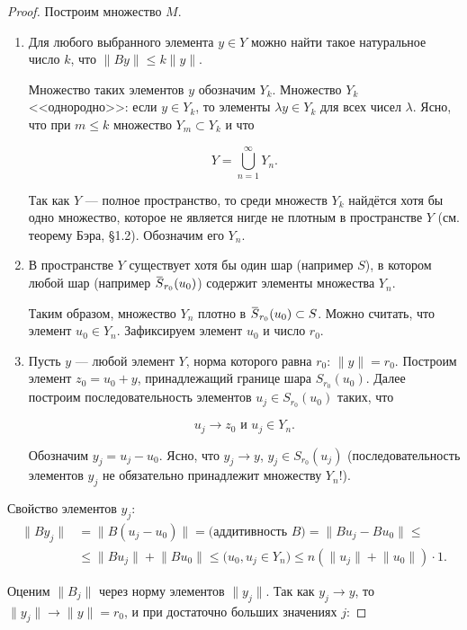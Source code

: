 \documentclass[12pt,a4paper,titlepage,oneside]{book}
\newcommand{\overbar}[1]{\mkern 1.5mu\overline{\mkern-1.5mu#1\mkern-1.5mu}\mkern 1.5mu}
\theoremstyle{definition}
\theoremstyle{plain}
\theoremstyle{break}
\theoremstyle{remark}
\theoremstyle{remark}
\theoremstyle{remark}
\theoremstyle{remark}
\theoremstyle{plain}
\theoremstyle{plain}
\begin{document}
\begin{proof}
Построим множество $M$.

\begin{enumerate}
	\item Для любого выбранного элемента $y \in Y$ можно найти такое натуральное число $k$, что $\lVert By\rVert \leqslant k\lVert y\rVert$.
	
	Множество таких элементов $y$ обозначим $Y_k$. Множество $Y_k$ <<однородно>>: если $y \in Y_k$, то элементы $\lambda y \in Y_k$ для всех чисел $\lambda$. Ясно, что при $m \leqslant k$ множество $Y_m \subset Y_k$ и что

$$Y=\bigcup\limits_{n=1}^\infty Y_n.$$
	
	Так как $Y$ --- полное пространство, то среди множеств $Y_k$ найдётся хотя бы одно множество, которое не является нигде не плотным в пространстве $Y$ (см. теорему Бэра, \S 1.2). Обозначим его $Y_n$.
	
	\item В пространстве $Y$ существует хотя бы один шар (например $S$), в котором любой шар (например $\overbar{S}_{r_0}(u_0)$) содержит элементы множества $Y_n$.
	
	Таким образом, множество $Y_n$ плотно в $\overbar{S}_{r_0}(u_0)\subset S$. Можно считать, что элемент $u_0 \in Y_n$. Зафиксируем элемент $u_0$ и число $r_0$.
	
	\item Пусть $y$ --- любой элемент $Y$, норма которого равна $r_0$: $\lVert y\rVert=r_0$. Построим элемент $z_0=u_0+y$, принадлежащий границе шара $S_{r_0}(u_0)$. Далее построим последовательность элементов $u_j \in S_{r_0}(u_0)$ таких, что

$$u_j \to z_0 \mbox{ и } u_j \in Y_n.$$

Обозначим $y_j=u_j-u_0$. Ясно, что $y_j \to y$, $y_j \in S_{r_0}(u_j)$ (последовательность элементов $y_j$ не обязательно принадлежит множеству $Y_n$!).	
\end{enumerate}

Свойство элементов $y_j$:
\begin{align*}
\lVert By_j\rVert &= \lVert B(u_j - u_0)\rVert = \mbox{(аддитивность $B$)} = \lVert Bu_j - Bu_0 \rVert \leqslant\\
&\leqslant \lVert Bu_j\rVert + \lVert Bu_0 \rVert \leqslant \mbox{($u_0, u_j \in Y_n$)} \leqslant n(\lVert u_j\rVert + \lVert u_0\rVert)\cdot 1.
\end{align*}

Оценим $\lVert B_j\rVert$ через норму элементов $\lVert y_j\rVert$. Так как $y_j \to y$, то $\lVert y_j\rVert \to \lVert y\rVert=r_0$, и при достаточно больших значениях $j$:


\end{proof}
\end{document}
